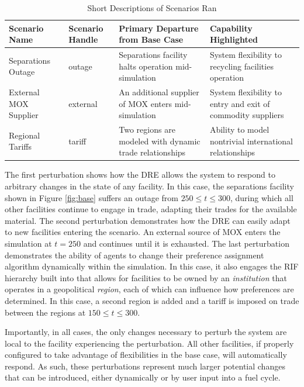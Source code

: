 \begin{table}[]
\centering
\caption{Short Descriptions of Scenarios Ran}
\label{scenarios}
\begin{tabularx}{\textwidth}{|p{1.5cm}|p{1.5cm}|X|X|}
\hline
\textbf{Scenario  Name} & \textbf{Scenario Handle} & \textbf{Primary Departure from Base Case}                & \textbf{Capability Highlighted}                             \\ \hline
Separations Outage      & outage                   & Separations facility halts operation mid-simulation      & System flexibility to recycling facilities operation        \\ \hline
External MOX Supplier   & external                 & An additional supplier of MOX enters mid-simulation      & System flexibility to entry and exit of commodity suppliers \\ \hline
Regional Tariffs        & tariff                   & Two regions are modeled with dynamic trade relationships & Ability to model nontrivial international relationships     \\ \hline
\end{tabularx}
\end{table}

The first perturbation shows how the \gls{DRE} allows the system to respond to
arbitrary changes in the state of any facility.  In this case, the separations
facility shown in Figure \ref{fig:base} suffers an outage from $250 \leq t
\leq 300$, during which all other facilities continue to engage in trade,
adapting their trades for the available material.  The second perturbation
demonstrates how the \gls{DRE} can easily adapt to new facilities entering the
scenario.  An external source of MOX enters the simulation at $t = 250$ and
continues until it is exhausted.  The last perturbation demonstrates the
ability of agents to change their preference assignment algorithm dynamically
within the simulation.  In this case, it also engages the \gls{RIF} hierarchy
built into \Cyclus{} that allows for facilities to be owned by an
\textit{institution} that operates in a geopolitical \textit{region}, each of
which can influence how preferences are determined.  In this case, a second
region is added and a tariff is imposed on trade between the regions at $150
\leq t \leq 300$.

Importantly, in all cases, the only changes necessary to perturb the system
are local to the facility experiencing the perturbation.  All other
facilities, if properly configured to take advantage of flexibilities in the
base case, will automatically respond.  As such, these perturbations represent
much larger potential changes that can be introduced, either dynamically or by
user input into a fuel cycle.

